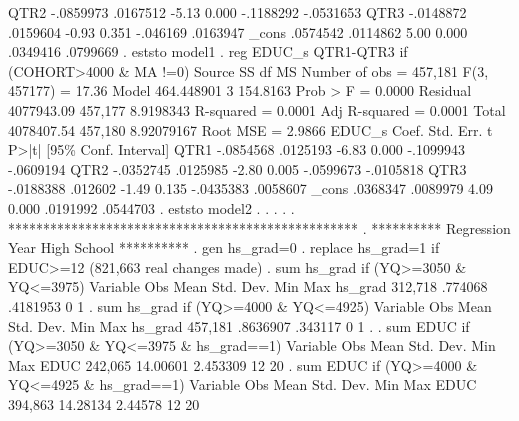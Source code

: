         QTR2 {\VBAR}  -.0859973   .0167512    -5.13   0.000    -.1188292   -.0531653
        QTR3 {\VBAR}  -.0148872   .0159604    -0.93   0.351     -.046169    .0163947
       _cons {\VBAR}   .0574542   .0114862     5.00   0.000     .0349416    .0799669
{\smallskip}
. eststo model1
{\smallskip}
. reg EDUC_s QTR1-QTR3  if (COHORT>4000 \& MA !=0)
{\smallskip}
      Source {\VBAR}       SS           df       MS      Number of obs   =   457,181
   F(3, 457177)    =     17.36
       Model {\VBAR}  464.448901         3    154.8163   Prob > F        =    0.0000
    Residual {\VBAR}  4077943.09   457,177   8.9198343   R-squared       =    0.0001
   Adj R-squared   =    0.0001
       Total {\VBAR}  4078407.54   457,180  8.92079167   Root MSE        =    2.9866
{\smallskip}
      EDUC_s {\VBAR}      Coef.   Std. Err.      t    P>|t|     [95\% Conf. Interval]
        QTR1 {\VBAR}  -.0854568   .0125193    -6.83   0.000    -.1099943   -.0609194
        QTR2 {\VBAR}  -.0352745   .0125985    -2.80   0.005    -.0599673   -.0105818
        QTR3 {\VBAR}  -.0188388    .012602    -1.49   0.135    -.0435383    .0058607
       _cons {\VBAR}   .0368347   .0089979     4.09   0.000     .0191992    .0544703
{\smallskip}
. eststo model2
{\smallskip}
. 
. 
. 
. 
. **************************************************
. **********  Regression Year High School **********
. gen hs_grad=0
{\smallskip}
. replace hs_grad=1 if EDUC>=12
(821,663 real changes made)
{\smallskip}
. sum hs_grad if (YQ>=3050 \& YQ<=3975)
{\smallskip}
    Variable {\VBAR}        Obs        Mean    Std. Dev.       Min        Max
     hs_grad {\VBAR}    312,718     .774068    .4181953          0          1
{\smallskip}
. sum hs_grad if (YQ>=4000 \& YQ<=4925)
{\smallskip}
    Variable {\VBAR}        Obs        Mean    Std. Dev.       Min        Max
     hs_grad {\VBAR}    457,181    .8636907     .343117          0          1
{\smallskip}
. 
. sum EDUC if (YQ>=3050 \& YQ<=3975 \& hs_grad==1)
{\smallskip}
    Variable {\VBAR}        Obs        Mean    Std. Dev.       Min        Max
        EDUC {\VBAR}    242,065    14.00601    2.453309         12         20
{\smallskip}
. sum EDUC if (YQ>=4000 \& YQ<=4925 \& hs_grad==1)
{\smallskip}
    Variable {\VBAR}        Obs        Mean    Std. Dev.       Min        Max
        EDUC {\VBAR}    394,863    14.28134     2.44578         12         20
